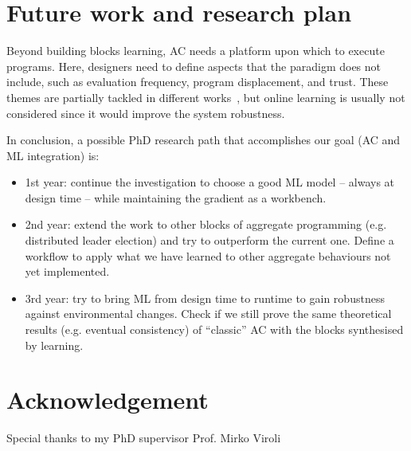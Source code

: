 \documentclass[conference]{IEEEtran}
\begin{document}
\section{Future work and research plan}
%
%
%

%
%

Beyond building blocks learning, AC needs a platform upon which to execute programs. 
%
Here, designers need to define aspects that the paradigm does not include, such as evaluation frequency, program displacement, and trust.
% 
These themes are partially tackled in different works~\cite{DBLP:journals/scp/CasadeiAV18, DBLP:journals/fi/CasadeiPPVW20, DBLP:journals/corr/abs-2012-13806}, but online learning is usually not considered since it would improve the system robustness.

%
%
In conclusion, a possible PhD research path that accomplishes our goal (AC and ML integration) is:
\begin{itemize}
    \item 1st year: continue the investigation to choose a good ML model -- always at design time -- while maintaining the gradient as a workbench.
    \item 2nd year: extend the work to other blocks of aggregate programming (e.g. distributed leader election) and try to outperform the current one. Define a workflow to apply what we have learned to other aggregate behaviours not yet implemented.
    \item 3rd year: try to bring ML from design time to runtime to gain robustness against environmental changes. Check if we still prove the same theoretical results (e.g. eventual consistency) of ``classic'' AC with the blocks synthesised by learning.
\end{itemize}
\section*{Acknowledgement}
Special thanks to my PhD supervisor Prof. Mirko Viroli


\end{document}
